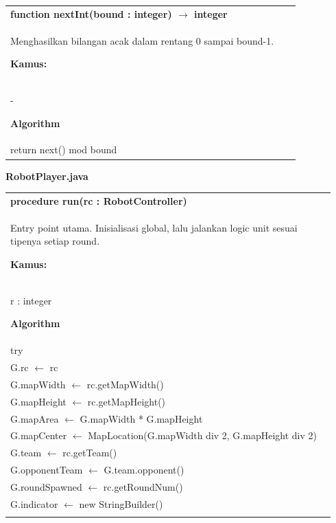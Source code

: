 \documentclass{article}
\newenvironment{pseudobox}
{
\centering
\begin{longtable}{|p{0.94\linewidth}|}
\hline
}
{
\\ \hline
\end{longtable}
\vspace{0.05cm}
}
\begin{document}
\begin{pseudobox}
\textbf{function nextInt(bound : integer) $\rightarrow$ integer} \\
{ Menghasilkan bilangan acak dalam rentang 0 sampai bound-1. }

\textbf{Kamus:} \\
\hspace*{1em} -

\textbf{Algorithm} \\
\hspace*{1em} return next() mod bound
\end{pseudobox}



\item \textbf{RobotPlayer.java}

\begin{pseudobox}
\textbf{procedure run(rc : RobotController)} \\
{ Entry point utama. Inisialisasi global, lalu jalankan logic unit sesuai tipenya setiap round. }

\textbf{Kamus:} \\
\hspace*{1em} r : integer

\textbf{Algorithm} \\
\hspace*{1em} try \\
\hspace*{2em} G.rc $\leftarrow$ rc \\
\hspace*{2em} G.mapWidth $\leftarrow$ rc.getMapWidth() \\
\hspace*{2em} G.mapHeight $\leftarrow$ rc.getMapHeight() \\
\hspace*{2em} G.mapArea $\leftarrow$ G.mapWidth * G.mapHeight \\
\hspace*{2em} G.mapCenter $\leftarrow$ MapLocation(G.mapWidth div 2, G.mapHeight div 2) \\
\hspace*{2em} G.team $\leftarrow$ rc.getTeam() \\
\hspace*{2em} G.opponentTeam $\leftarrow$ G.team.opponent() \\
\hspace*{2em} G.roundSpawned $\leftarrow$ rc.getRoundNum() \\
\hspace*{2em} G.indicator $\leftarrow$ new StringBuilder() \\


\end{pseudobox}
\end{document}
